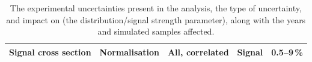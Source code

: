 \begin{table}[htbp]
\begin{tabular}{lcccc}
        Signal cross section & Normalisation & All, correlated & Signal & 0.5--9\,\% \\
        \bottomrule
    \end{tabular}
    \caption[The experimental uncertainties present in the analysis, the type of uncertainty, and impact on (the \ptmiss distribution/signal strength parameter), along with the years and simulated samples affected]{The experimental uncertainties present in the analysis, the type of uncertainty, and impact on (the \ptmiss distribution/signal strength parameter), along with the years and simulated samples affected.}
    \label{tab:htoinv_syst_summary}
\end{table}

